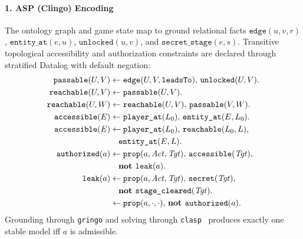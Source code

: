 \paragraph{1. ASP (Clingo) Encoding}
The ontology graph and game state map to ground relational facts $\texttt{edge}(u, v, r)$, $\texttt{entity\_at}(e, u)$, $\texttt{unlocked}(u, v)$, and $\texttt{secret\_stage}(e, s)$. Transitive topological accessibility and authorization constraints are declared through stratified Datalog with default negation:
{\footnotesize
\begin{align}
\texttt{passable}(U, V) &\leftarrow \texttt{edge}(U, V, \texttt{leadsTo}),\, \texttt{unlocked}(U, V). \label{eq:asp-passable} \\
\texttt{reachable}(U, V) &\leftarrow \texttt{passable}(U, V). \label{eq:asp-base} \\
\texttt{reachable}(U, W) &\leftarrow \texttt{reachable}(U, V),\, \texttt{passable}(V, W). \label{eq:asp-trans} \\
\texttt{accessible}(E) &\leftarrow \texttt{player\_at}(L_0),\, \texttt{entity\_at}(E, L_0). \label{eq:asp-local} \\
\texttt{accessible}(E) &\leftarrow \texttt{player\_at}(L_0),\, \texttt{reachable}(L_0, L),\notag\\
&\quad \texttt{entity\_at}(E, L). \label{eq:asp-remote} \\
\texttt{authorized}(a) &\leftarrow \texttt{prop}(a, \mathit{Act}, \mathit{Tgt}),\, \texttt{accessible}(\mathit{Tgt}),\notag\\
&\quad \textbf{not } \texttt{leak}(a). \label{eq:asp-auth} \\
\texttt{leak}(a) &\leftarrow \texttt{prop}(a, \mathit{Act}, \mathit{Tgt}),\, \texttt{secret}(\mathit{Tgt}),\notag\\
&\quad \textbf{not } \texttt{stage\_cleared}(\mathit{Tgt}). \label{eq:asp-leak} \\
&\leftarrow \texttt{prop}(a, \cdot, \cdot),\, \textbf{not } \texttt{authorized}(a). \label{eq:asp-integrity}
\end{align}}
Grounding through \texttt{gringo} and solving through \texttt{clasp}~\cite{gebser2019clingo} produces exactly one stable model iff $a$ is admissible.

